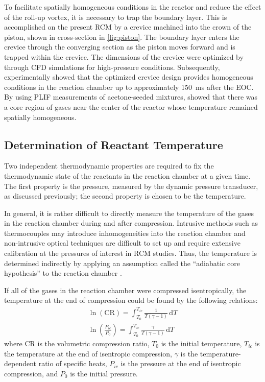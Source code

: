 \documentclass[12pt, letterpaper]{article}
\begin{document}
To facilitate spatially homogeneous conditions in the reactor
and reduce the effect of the roll-up vortex, it is necessary to trap
the boundary layer. This is accomplished on the present RCM by a
crevice machined into the crown of the piston, shown in cross-section
in \autoref{fig:piston}. The boundary layer enters the crevice through
the converging section as the piston moves forward and is trapped
within the crevice. The dimensions of the crevice were optimized
by \textcite{Mittal2006a} through CFD simulations for high-pressure
conditions. Subsequently, \textcite{Mittal2006b} experimentally showed that
the optimized crevice design provides homogeneous conditions in the
reaction chamber up to approximately \SI{150}{\milli\second} after the EOC.
By using PLIF measurements of acetone-seeded mixtures,
\textcite{Mittal2006b} showed that there was a core region of gases
near the center of the reactor whose temperature remained spatially
homogeneous.

\subsection{Determination of Reactant Temperature}

Two independent thermodynamic properties are required to fix the
thermodynamic state of the reactants in the reaction chamber at a
given time. The first property is the pressure, measured by the dynamic
pressure transducer, as discussed previously; the second property
is chosen to be the temperature.

In general, it is rather difficult to directly measure the temperature
of the gases in the reaction chamber during and after compression.
Intrusive methods such as thermocouples may introduce inhomogeneities into
the reaction chamber and non-intrusive optical techniques are difficult to set up
and require extensive calibration at the pressures of interest in RCM
studies. Thus, the temperature is determined indirectly by applying an
assumption called the ``adiabatic core hypothesis'' to the reaction chamber
\cite{Mittal2007, Lee1998}.

If all of the gases in the reaction chamber were compressed isentropically,
the temperature at the end of compression could be found by the
following relations:
%
\begin{subequations}
\label{eq:tic}
\begin{align}
\ln\left(\text{CR}\right) = \int_{T_0}^{T_{ic}} \! \frac{1}{T\left(\gamma-1\right)} \, \mathrm{d} T \\
\ln\left(\frac{P_{ic}}{P_0}\right) = \int_{T_0}^{T_{ic}} \! \frac{\gamma}{T\left(\gamma-1\right)} \, \mathrm{d} T
\end{align}
\end{subequations}
%
where CR is the volumetric compression ratio, $T_0$ is the initial temperature,
$T_{ic}$ is the temperature at the end of isentropic compression, $\gamma$ is the
temperature-dependent ratio of specific heats, $P_{ic}$ is the pressure at the
end of isentropic compression, and $P_0$ is the initial pressure.
\end{document}
